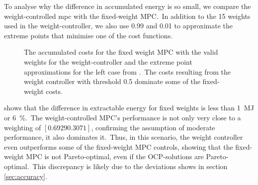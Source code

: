 To analyse why the difference in accumulated energy is so small, we compare the weight-controlled \ac{mpc} with the fixed-weight MPC.\ 
In addition to the 15 weights used in the weight-controller, we also use 0.99 and 0.01 to approximate the extreme points that minimise one of the cost functions.\ 
\begin{figure}[htb]
	\centering
	\fontsize{8}{0}\selectfont
	\def\svgwidth{0.49\textwidth}
	
	\caption{The accumulated costs for the fixed weight MPC with the valid weights for the weight-controller and the extreme point approximations for the left case from .\ The costs resulting from the weight controller with threshold 0.5 dominate some of the fixed-weight costs.}
	\label{fig:mpc_pf}
\end{figure}

 shows that the difference in extractable energy for fixed weights is less than \SI{1}{\mega\joule} or \SI{6}{\percent}.\ 
The weight-controlled MPC's performance is not only very close to a weighting of $[0.6929 0.3071]$, confirming the assumption of moderate performance, it also dominates it.\ 
Thus, in this scenario, the weight controller even outperforms some of the fixed-weight MPC controls, showing that the fixed-weight MPC is not Pareto-optimal, even if the OCP-solutions are Pareto-optimal.\ 
This discrepancy is likely due to the deviations shows in section \ref{sec:accuracy}.
 


\begin{figure*}[htb]
	\centering
	\fontsize{8}{0}\selectfont
	\def\svgwidth{0.97\textwidth}
	
	\caption{Evaluation of the \ac{mpc} with weight controller for three wave scenarios and two target damage values.\ For clarity, only every 100th value is displayed. Top: Accumulated damage over time. Middle: The selected weight index \iw over time. A lower index corresponds to a higher weighting for the damage cost. Bottom: Extracted energy over time. For the lower damage thresholds, the extracted energy reduces only by 0.09, 0.05, and \SI{0.06}{\mega\joule} for the three cases, respectively.}
	\label{fig:weight_control}
\end{figure*}